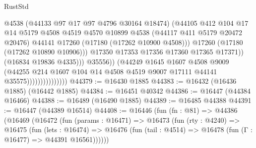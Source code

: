 \begin{lexlean}{RustStd}
\begin{coremodule}
{\begin{coremodule}
{{{{{{{{{{{{{{{{{{{{{{{{{{{{{{{{{{{{{{{{{{{{{{{{{{{{{{{                                            @4538
                                            (@44133 @97 @17 @97 @4796 @30164 @18474)
                                            (@44105
                                              @412
                                              @104
                                              @17
                                              @14
                                              @5179
                                              @4508
                                              @4519
                                              @4570
                                              @10899
                                              @4538
                                              (@44117 @411 @5179 @20472 @20476)
                                              @44141
                                              @17260
                                              (@17180 (@17262 @10900 @4508)))
                                            @17260
                                            (@17180 (@17262 @10890 @10906)))
                                          @17350
                                          @17353
                                          @17356
                                          @17360
                                          @17365
                                          @17371))
                                      (@16834 @19836 @4335)))
                                  @35556))
                              (@44249
                                @1645
                                @1607
                                @4508
                                @9009
                                (@44255
                                  @214
                                  @1607
                                  @104
                                  @14
                                  @4508
                                  @4519
                                  @9007
                                  @17111
                                  @44141
                                  @35575)))))))))))))))
@44379 := @16430 @1885
@44383 := @16432 (@16436 @1885) (@16442 @1885)
@44384 := @16451 @40342
@44386 := @16447 (@44384 @16466)
@44388 := @16489 (@16490 @1885)
@44389 := @16485 @44388
@44391 := @16447 (@44389 @16514)
@44408 := @16446
    (fun (fn : @81) =>
    @44386
      (@16469
        (@16472
          (fun (params : @16471) =>
          @16473
            (fun (rty : @4240) =>
            @16475
              (fun (lets : @16474) =>
              @16476 (fun (tail : @4514) => @16478 (fun (Γ : @16477) => @44391 @16561))))))
}}}}}}}}}}}}}}}}}}}}}}}}}}}}}}}}}}}}}}}}}}}}}}}}}}}}}}}
\end{coremodule}}
\end{coremodule}
\end{lexlean}
